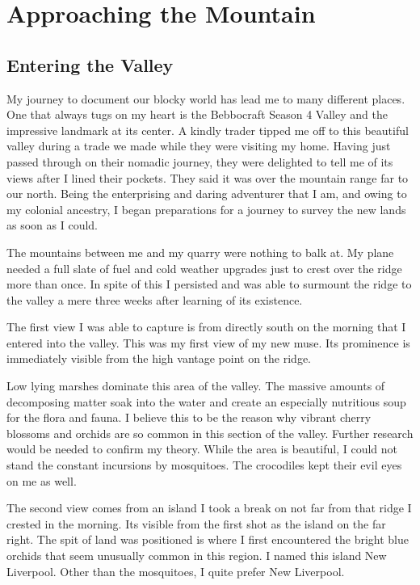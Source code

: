 \chapter{Approaching the Mountain}
\section{Entering the Valley}

My journey to document our blocky world has lead me to many different places. One that always tugs on my heart is the Bebbocraft Season 4 Valley and the impressive landmark at its center.
A kindly trader tipped me off to this beautiful valley during a trade we made while they were visiting my home. Having just passed through on their nomadic journey, they were delighted to tell me of its views after I lined their pockets. They said it was over the mountain range far to our north. Being the enterprising and daring adventurer that I am, and owing to my colonial ancestry, I began preparations for a journey to survey the new lands as soon as I could.

The mountains between me and my quarry were nothing to balk at. My plane needed a full slate of fuel and cold weather upgrades just to crest over the ridge more than once. In spite of this I persisted and was able to surmount the ridge to the valley a mere three weeks after learning of its existence.

The first view I was able to capture is from directly south on the morning that I entered into the valley. This was my first view of my new muse. Its prominence is immediately visible from the high vantage point on the ridge.

Low lying marshes dominate this area of the valley. The massive amounts of decomposing matter soak into the water and create an especially nutritious soup for the flora and fauna. I believe this to be the reason why vibrant cherry blossoms and orchids are so common in this section of the valley. Further research would be needed to confirm my theory. While the area is beautiful, I could not stand the constant incursions by mosquitoes. The crocodiles kept their evil eyes on me as well.

The second view comes from an island I took a break on not far from that ridge I crested in the morning. Its visible from the first shot as the island on the far right. The spit of land was positioned is where I first encountered the bright blue orchids that seem unusually common in this region. I named this island New Liverpool. Other than the mosquitoes, I quite prefer New Liverpool.

